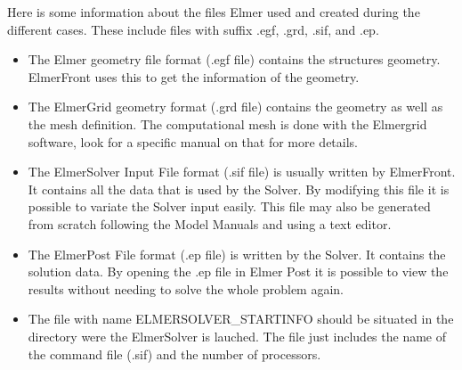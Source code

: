 Here is some information about the files Elmer used and created during the
different cases. These include files with suffix
.egf, .grd, .sif, and .ep.
\begin{itemize}
\item The Elmer geometry file format (.egf file) contains the structures
      geometry. ElmerFront uses this to get the information of the geometry.
\item The ElmerGrid geometry format (.grd file) contains the
      geometry as well as the mesh definition. The computational mesh
      is done with the Elmergrid software, look for a specific manual
      on that for more details.
\item The ElmerSolver Input File format (.sif file) is usually written by
      ElmerFront. It contains all the data that is used by the Solver.
      By modifying this  file it is possible to variate the Solver input
      easily. This file may also be generated from scratch following
      the Model Manuals and using a text editor.
\item The ElmerPost File format (.ep file) is written by the Solver.
      It contains the solution data. By opening the .ep file in Elmer
      Post it is possible to view the results without needing to solve
      the whole problem again.
\item The file with name ELMERSOLVER\_STARTINFO should be
      situated in the directory were the ElmerSolver is lauched.
      The file just includes the name of the command file (.sif) and
      the number of processors.
\end{itemize}



